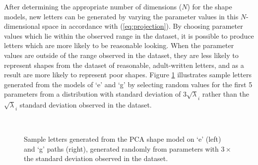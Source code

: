 \documentclass{sig-alternate}
\begin{document}
After determining the appropriate number of dimensions ($N$) for the shape
models, new letters can be generated by varying the parameter values in this
$N$-dimensional space in accordance with (\ref{eq:projection}). By choosing
parameter values which lie within the observed range in the dataset, it is
possible to produce letters which are more likely to be reasonable looking.
When the parameter values are outside of the range observed in the dataset, they
are less likely to represent shapes from the dataset of reasonable,
adult-written letters, and as a result are more likely to represent poor shapes.%
%
%
Figure \ref{fig:sampleLetters} illustrates sample letters generated from the
models of `e' and `g' by selecting random values for the first 5 parameters 
from a distribution with
standard deviation of $3\sqrt\lambda_i$ rather than the $\sqrt\lambda_i$
standard deviation observed in the dataset.

\begin{figure}[thpb]
\centering
{}
~~~~~
\caption[Sample letters generated from the PCA shape model on `e' and `g'
paths.]{\label{fig:sampleLetters}Sample letters generated from the PCA shape
model on `e' (left) and `g' paths (right), generated randomly from
parameters with $3\times$ the standard deviation observed in the dataset.}

\end{figure}
\end{document}
